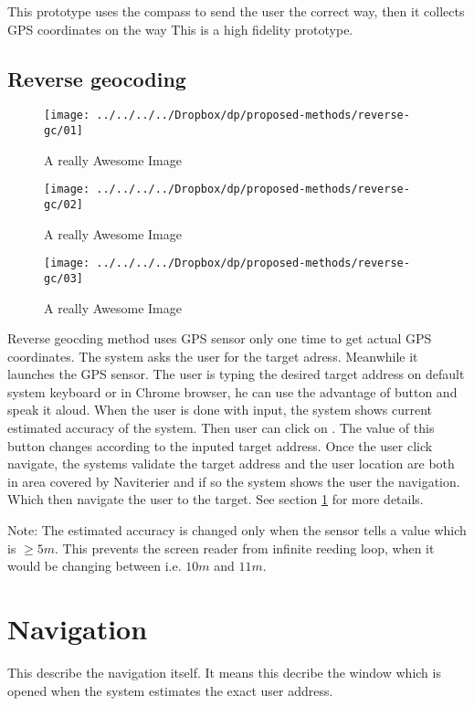 		This prototype uses the compass to send the user the correct way, then it collects GPS coordinates on the way
		This is a high fidelity prototype.
		\subsection{Reverse geocoding}
		
		\begin{figure}[!htb]
			\texttt{[image: ../../../../Dropbox/dp/proposed-methods/reverse-gc/01]}
			\caption{A really Awesome Image}\label{fig:awesome_image1}
			\endminipage\hfill
			\texttt{[image: ../../../../Dropbox/dp/proposed-methods/reverse-gc/02]}
			\caption{A really Awesome Image}\label{fig:awesome_image2}
			\endminipage\hfill
			\texttt{[image: ../../../../Dropbox/dp/proposed-methods/reverse-gc/03]}
			\caption{A really Awesome Image}\label{fig:awesome_image3}
			\endminipage
		\end{figure}
		
		Reverse geocding method uses GPS sensor only one time to get actual GPS coordinates. 
		The system asks the user for the target adress. Meanwhile it launches the GPS sensor.
		The user is typing the desired target address on default system keyboard or in Chrome browser, he can use the advantage of button  and speak it aloud.
		When the user is done with input, the system shows current estimated accuracy of the system.
		Then user can click on . The value of this button changes according to the inputed target address.
		Once the user click navigate, the systems validate the target address and the user location are both in area covered by Naviterier and if so the system shows the user the navigation. Which then navigate the user to the target. See section \ref{sec:navifation} for more details.
		
		Note: The estimated accuracy is changed only when the sensor tells a value which is $\geq 5m$. This prevents the screen reader from infinite reeding loop, when it would be changing between i.e. $10m$ and $11m$. 
		\section{Navigation}
		\label{sec:navifation}
		This describe the navigation itself. It means this decribe the window which is opened when the system estimates the exact user address.

		
		
				
	